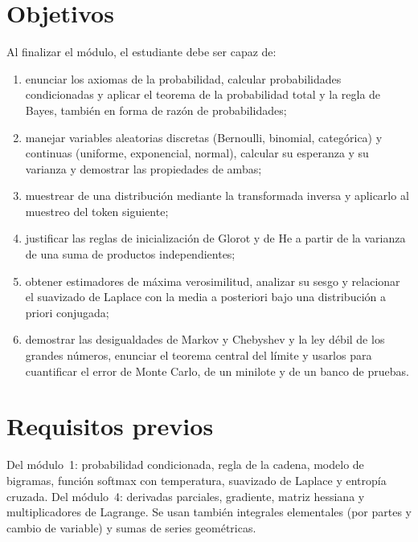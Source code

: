 \documentclass[11pt,a4paper,twoside,openany]{book}
\begin{document}
\section*{Objetivos}
Al finalizar el módulo, el estudiante debe ser capaz de:
\begin{enumerate}[label=\arabic*.]
  \item enunciar los axiomas de la probabilidad, calcular probabilidades condicionadas y aplicar el teorema de la probabilidad total y la regla de Bayes, también en forma de razón de probabilidades;
  \item manejar variables aleatorias discretas (Bernoulli, binomial, categórica) y continuas (uniforme, exponencial, normal), calcular su esperanza y su varianza y demostrar las propiedades de ambas;
  \item muestrear de una distribución mediante la transformada inversa y aplicarlo al muestreo del token siguiente;
  \item justificar las reglas de inicialización de Glorot y de He a partir de la varianza de una suma de productos independientes;
  \item obtener estimadores de máxima verosimilitud, analizar su sesgo y relacionar el suavizado de Laplace con la media a posteriori bajo una distribución a priori conjugada;
  \item demostrar las desigualdades de Markov y Chebyshev y la ley débil de los grandes números, enunciar el teorema central del límite y usarlos para cuantificar el error de Monte Carlo, de un minilote y de un banco de pruebas.
\end{enumerate}

\section*{Requisitos previos}
Del módulo~1: probabilidad condicionada, regla de la cadena, modelo de bigramas, función softmax con temperatura, suavizado de Laplace y entropía cruzada. Del módulo~4: derivadas parciales, gradiente, matriz hessiana y multiplicadores de Lagrange. Se usan también integrales elementales (por partes y cambio de variable) y sumas de series geométricas.
\end{document}
